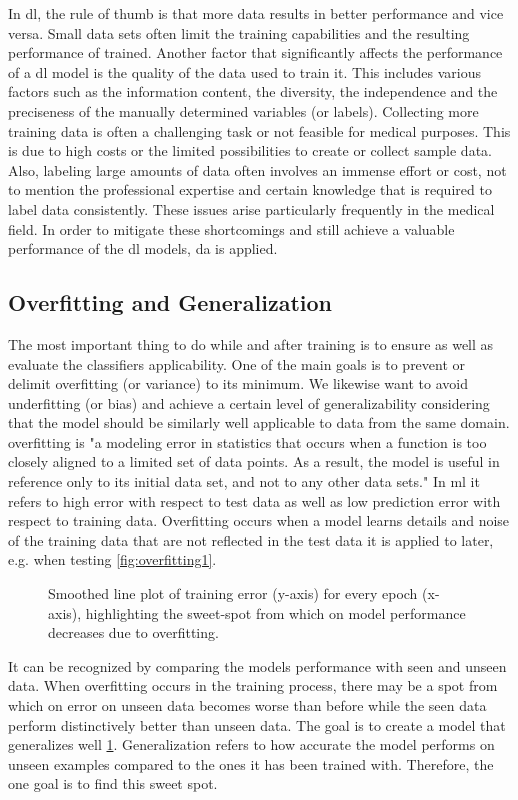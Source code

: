 In \acrshort{dl}, the rule of thumb is that more data results in better performance and vice versa. Small data sets often limit the training capabilities and the resulting performance of trained. Another factor that significantly affects the performance of a \acrshort{dl} model is the quality of the data used to train it. This includes various factors such as the information content, the diversity, the independence and the preciseness of the manually determined variables (or labels). Collecting more training data is often a challenging task or not feasible for medical purposes. This is due to high costs or the limited possibilities to create or collect sample data. Also, labeling large amounts of data often involves an immense effort or cost, not to mention the professional expertise and certain knowledge that is required to label data consistently. These issues arise particularly frequently in the medical field. In order to mitigate these shortcomings and still achieve a valuable performance of the \acrshort{dl} models, \acrshort{da} is applied.

\subsection{Overfitting and Generalization}

The most important thing to do while and after training is to ensure as well as evaluate the classifiers applicability. One of the main goals is to prevent or delimit \gls{overfitting} (or variance) to its minimum. We likewise want to avoid underfitting (or bias) and achieve a certain level of \gls{generalizability} considering that the model should be similarly well applicable to data from the same domain. \Gls{overfitting} is "a modeling error in statistics that occurs when a function is too closely aligned to a limited set of data points. As a result, the model is useful in reference only to its initial data set, and not to any other data sets." \cite{Twin.2021} In \acrshort{ml} it refers to high error with respect to test data as well as low prediction error with respect to training data. Overfitting occurs when a model learns details and noise of the training data that are not reflected in the test data it is applied to later, e.g. when testing \cref{fig:overfitting1}.
\begin{figure}[H]
    \centering
    
    \caption[Sweet-spot of generalization]{ Smoothed line plot of training error (y-axis) for every epoch (x-axis), highlighting the sweet-spot from which on model performance decreases due to overfitting. \cite{user121799.2022}}
    \label{fig:overfitting2}
\end{figure}
It can be recognized by comparing the models performance with seen and unseen data. When \gls{overfitting} occurs in the training process, there may be a spot from which on error on unseen data becomes worse than before while the seen data perform distinctively better than unseen data. The goal is to create a model that generalizes well \cref{fig:overfitting2}. Generalization refers to how accurate the model performs on unseen examples compared to the ones it has been trained with. Therefore, the one goal is to find this sweet spot.

